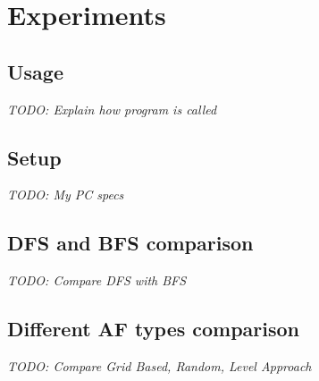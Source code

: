 \chapter{Experiments}

\section{Usage}
\textit{TODO: Explain how program is called}

\section{Setup}
\textit{TODO: My PC specs}

\section{DFS and BFS comparison}
\textit{TODO: Compare DFS with BFS}

\section{Different AF types comparison}
\textit{TODO: Compare Grid Based, Random, Level Approach}